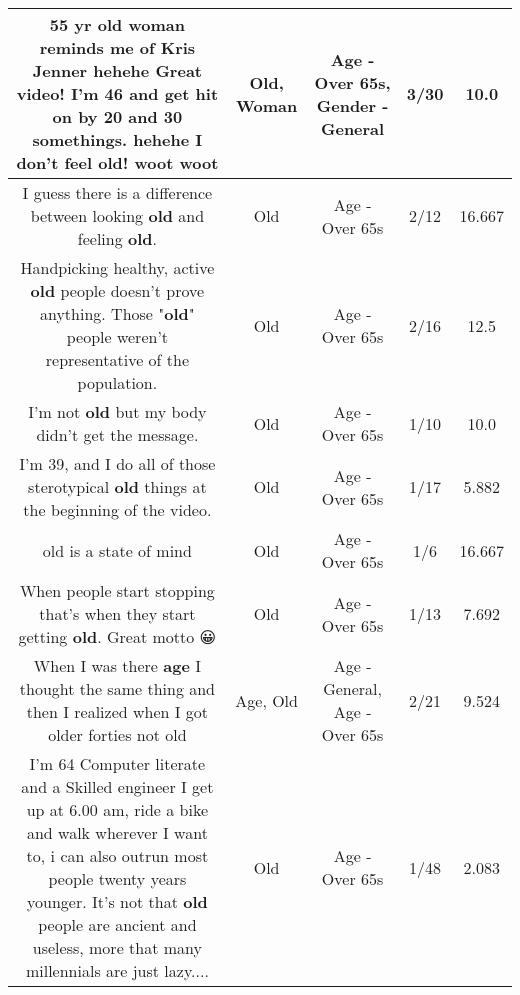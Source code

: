 \documentclass[11pt]{article}
\newlength\mylength
\begin{document}
\begin{center}
\begin{longtable}{|C{.65\mylength}|C{.30\mylength}|C{.12\mylength}|C{.12\mylength}|C{.12\mylength}|}
  \small 55 yr \textbf{old} \textbf{woman} reminds me of Kris Jenner hehehe  Great video!  I'm  46 and get hit on by 20 and 30 somethings. hehehe I don't feel \textbf{old}!  woot woot\normalsize   & Old, Woman & Age - Over 65s, Gender - General & 3/30 & 10.0 \\  \hline
  \small I guess there is a difference between looking \textbf{old} and feeling \textbf{old}.\normalsize   & Old & Age - Over 65s & 2/12 & 16.667 \\  \hline
  \small Handpicking healthy, active \textbf{old} people doesn't prove anything. Those "\textbf{old}"  people weren't representative of the population.\normalsize   & Old & Age - Over 65s & 2/16 & 12.5 \\  \hline
  \small I'm not \textbf{old} but my body didn't get the message.\normalsize   & Old & Age - Over 65s & 1/10 & 10.0 \\  \hline
  \small I'm 39, and I do all of those sterotypical \textbf{old} things at the beginning of the video.\normalsize   & Old & Age - Over 65s & 1/17 & 5.882 \\  \hline
  \small old is a state of mind\normalsize   & Old & Age - Over 65s & 1/6 & 16.667 \\  \hline
  \small When people start stopping that's when they start getting \textbf{old}. Great motto 😀\normalsize   & Old & Age - Over 65s & 1/13 & 7.692 \\  \hline
  \small When I was there \textbf{age} I thought the same thing and then I realized when I got older forties not old\normalsize   & Age, Old & Age - General, Age - Over 65s & 2/21 & 9.524 \\  \hline
  \small I'm 64 Computer literate and a Skilled engineer I get up at 6.00 am, ride a bike and walk wherever I want to, i can also outrun most people twenty years younger. It's not that \textbf{old} people are ancient and useless, more that many millennials are just lazy....\normalsize   & Old & Age - Over 65s & 1/48 & 2.083 \\  \hline

\end{longtable}
\end{center}
\end{document}
